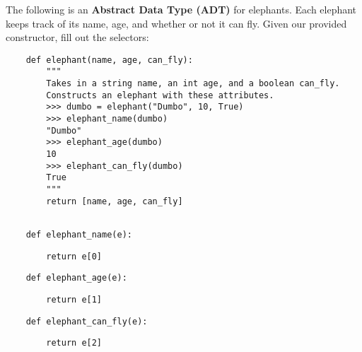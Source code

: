 \begin{blocksection}
    \question The following is an \textbf{Abstract Data Type (ADT)} for elephants.
    Each elephant keeps track of its name, age, and whether or not it can fly. Given
    our provided constructor, fill out the selectors:
    
    \begin{lstlisting}
    def elephant(name, age, can_fly):
        """
        Takes in a string name, an int age, and a boolean can_fly.
        Constructs an elephant with these attributes.
        >>> dumbo = elephant("Dumbo", 10, True)
        >>> elephant_name(dumbo)
        "Dumbo"
        >>> elephant_age(dumbo)
        10
        >>> elephant_can_fly(dumbo)
        True
        """
        return [name, age, can_fly]
    
    \end{lstlisting}
    
    \end{blocksection}
    \begin{blocksection}
    
    \begin{lstlisting}
    def elephant_name(e):
    \end{lstlisting}
    \begin{solution}[1in]
    \begin{lstlisting}
        return e[0]
    \end{lstlisting}
    \end{solution}
    \end{blocksection}
    \begin{blocksection}
    
    \begin{lstlisting}
    def elephant_age(e):
    \end{lstlisting}
    \begin{solution}[1in]
    \begin{lstlisting}
        return e[1]
    \end{lstlisting}
    \end{solution}
    \end{blocksection}
    \begin{blocksection}
    
    \begin{lstlisting}
    def elephant_can_fly(e):
    \end{lstlisting}
    \begin{solution}[1in]
    \begin{lstlisting}
        return e[2]
    \end{lstlisting}
    \end{solution}
    \end{blocksection}
    
